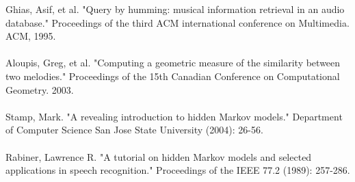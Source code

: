 \documentclass{article}
\begin{document}
	Ghias, Asif, et al. "Query by humming: musical information retrieval in an audio database." Proceedings of the third ACM international conference on Multimedia. ACM, 1995.
	\\ \\
	Aloupis, Greg, et al. "Computing a geometric measure of the similarity between two melodies." Proceedings of the 15th Canadian Conference on Computational Geometry. 2003.
	\\ \\
	Stamp, Mark. "A revealing introduction to hidden Markov models." Department of Computer Science San Jose State University (2004): 26-56.
	\\ \\
	Rabiner, Lawrence R. "A tutorial on hidden Markov models and selected applications in speech recognition." Proceedings of the IEEE 77.2 (1989): 257-286.
	\\
\end{document}
